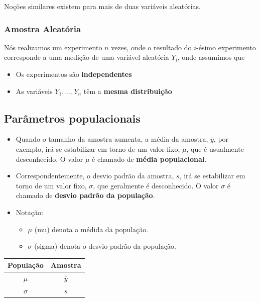 \documentclass[]{article}
\providecommand{\tightlist}{%
  \setlength{\itemsep}{0pt}\setlength{\parskip}{0pt}}
\begin{document}
Noções similares existem para mais de duas variáveis aleatórias.

\subsubsection{Amostra Aleatória}\label{amostra-aleatoria}

Nós realizamos um experimento \(n\) vezes, onde o resultado do
\(i\)-ésimo experimento corresponde a uma medição de uma variável
aleatória \(Y_i\), onde assumimos que

\begin{itemize}
\tightlist
\item
  Os experimentos são \textbf{independentes}
\item
  As variáveis \(Y_1,\ldots,Y_n\) têm a \textbf{mesma distribuição}
\end{itemize}

\subsection{Parâmetros populacionais}\label{parametros-populacionais}

\begin{itemize}
\tightlist
\item
  Quando o tamanho da amostra aumenta, a média da amostra,
  \(\overline{y}\), por exemplo, irá se estabilizar em torno de um valor
  fixo, \(\mu\), que é usualmente desconhecido. O valor \(\mu\) é
  chamado de \textbf{média populacional}.
\item
  Correspondentemente, o desvio padrão da amostra, \(s\), irá se
  estabilizar em torno de um valor fixo, \(\sigma\), que geralmente é
  desconhecido. O valor \(\sigma\) é chamado de \textbf{desvio padrão da
  população}.
\item
  Notação:

  \begin{itemize}
  \tightlist
  \item
    \(\mu\) (mu) denota a médida da população.
  \item
    \(\sigma\) (sigma) denota o desvio padrão da população.
  \end{itemize}
\end{itemize}

\begin{longtable}[]{@{}cc@{}}
\toprule
População & Amostra\tabularnewline
\midrule
\endhead
\(\mu\) & \(\overline{y}\)\tabularnewline
\(\sigma\) & \(s\)\tabularnewline
\bottomrule
\end{longtable}
\end{document}
